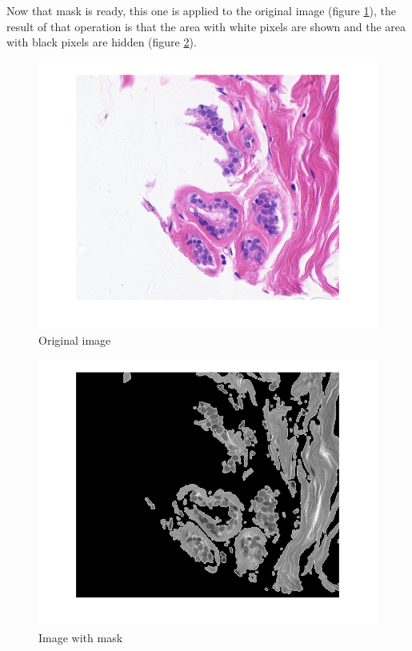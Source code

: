 \documentclass[conference]{IEEEtran}
\begin{document}
			\par Now that mask is ready, this one is applied to the original image (figure \ref{fig:original}), the result of that operation is that the area with white pixels are shown and the area with black pixels are hidden (figure \ref{fig:maskedimage}).
		
			\begin{figure}[h]
				\centering
				\includegraphics[width=0.7\linewidth]{images/fourrierFiltering/original}
				\caption{Original image}
				\label{fig:original}
			\end{figure}
		
			\begin{figure}[h]
				\centering
				\includegraphics[width=0.7\linewidth]{images/fourrierFiltering/maskedImage}
				\caption{Image with mask}
				\label{fig:maskedimage}
			\end{figure}
\end{document}
